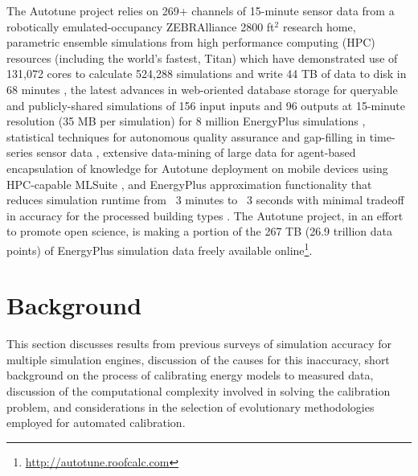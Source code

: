\documentclass[preprint, review, 12pt]{elsarticle}
\begin{document}
The Autotune project relies on 269+ channels of 15-minute sensor data from a robotically emulated-occupancy ZEBRAlliance \cite{cit:miller2012,cit:biswas2012} 2800 ft$^2$ research home, parametric ensemble simulations from high performance computing (HPC) resources (including the world's fastest, Titan) which have demonstrated use of 131,072 cores to calculate 524,288 simulations and write 44 TB of data to disk in 68 minutes \cite{cit:sanyal2013a}, the latest advances in web-oriented database storage for queryable and publicly-shared simulations of 156 input inputs and 96 outputs at 15-minute resolution (35 MB per simulation) for 8 million EnergyPlus simulations \cite{cit:sanyal2013b}, statistical techniques for autonomous quality assurance and gap-filling in time-series sensor data \cite{cit:castello2012}, extensive data-mining of large data for agent-based encapsulation of knowledge for Autotune deployment on mobile devices using HPC-capable MLSuite \cite{cit:edwards2013}, and EnergyPlus approximation functionality that reduces simulation runtime from ~3 minutes to ~3 seconds with minimal tradeoff in accuracy for the processed building types \cite{cit:edwards2013}. The Autotune project, in an effort to promote open science, is making a portion of the 267 TB (26.9 trillion data points) of EnergyPlus simulation data freely available online\footnote{\url{http://autotune.roofcalc.com}}.


\section{Background}
\label{sec:background}
This section discusses results from previous surveys of simulation accuracy for multiple simulation engines, discussion of the causes for this inaccuracy, short background on the process of calibrating energy models to measured data, discussion of the computational complexity involved in solving the calibration problem, and considerations in the selection
of evolutionary methodologies employed for automated calibration.
\end{document}
